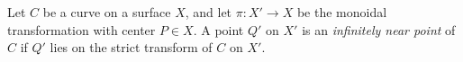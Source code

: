Let $C$ be a curve on a surface $X$, and let $\pi: X' \to X$ be the monoidal transformation with center $P \in X$. A point $Q'$ on $X'$ is an \textit{infinitely near point} of $C$ if $Q'$ lies on the strict transform of $C$ on $X'$.
